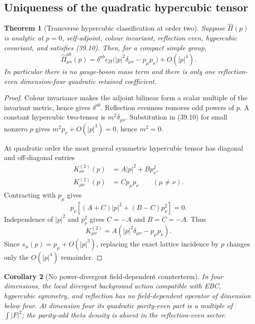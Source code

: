 \documentclass[11pt,oneside]{book}
\newtheorem{theorem}{Theorem}[chapter]
\newtheorem{corollary}[theorem]{Corollary}
\theoremstyle{definition}
\theoremstyle{remark}
\begin{document}
\subsection{Uniqueness of the quadratic hypercubic tensor}

\begin{theorem}[Transverse hypercubic classification at order two]
\label{thm:e8v39-hypercubic}
Suppose \(\widehat\Pi(p)\) is analytic at \(p=0\), self-adjoint,
colour invariant, reflection even, hypercubic covariant, and
satisfies (39.10).  Then, for a compact simple group,
\[
\boxed{\qquad
 \widehat\Pi_{\mu\nu}^{ab}(p)
 =
 \delta^{ab}c_\Pi
 \bigl(|p|^2\delta_{\mu\nu}-p_\mu p_\nu\bigr)
 +O(|p|^4).
\qquad}                                                         \tag{39.11}
\]
In particular there is no gauge-boson mass term and there is only one
reflection-even dimension-four quadratic retained coefficient.
\end{theorem}

\begin{proof}
Colour invariance makes the adjoint bilinear form a scalar multiple
of the invariant metric, hence gives \(\delta^{ab}\).  Reflection
evenness removes odd powers of \(p\).  A constant hypercubic
two-tensor is \(m^2\delta_{\mu\nu}\).  Substitution in (39.10) for
small nonzero \(p\) gives \(m^2p_\nu+O(|p|^3)=0\), hence \(m^2=0\).

At quadratic order the most general symmetric hypercubic tensor has
diagonal and off-diagonal entries
\[
\begin{split}
 K_{\nu\nu}^{(2)}(p)&=A|p|^2+Bp_\nu^2,\\
 K_{\mu\nu}^{(2)}(p)&=Cp_\mu p_\nu\qquad(\mu\ne\nu).             \tag{39.12}
\end{split}
\]
Contracting with \(p_\mu\) gives
\[
 p_\nu\left[(A+C)|p|^2+(B-C)p_\nu^2\right]=0.
\]
Independence of \(|p|^2\) and \(p_\nu^2\) gives
\(C=-A\) and \(B=C=-A\).  Thus
\[
 K_{\mu\nu}^{(2)}
 =A(|p|^2\delta_{\mu\nu}-p_\mu p_\nu).
\]
Since \(s_\mu(p)=p_\mu+O(|p|^3)\), replacing the exact lattice
incidence by \(p\) changes only the \(O(|p|^4)\) remainder.
\end{proof}

\begin{corollary}[No power-divergent field-dependent counterterm]
\label{cor:e8v39-no-power}
In four dimensions, the local divergent background action compatible
with EBC, hypercubic symmetry, and reflection has no
field-dependent operator of dimension below four.  At dimension four
its quadratic parity-even part is a multiple of
\(\int|F|^2\); the parity-odd theta density is absent in the
reflection-even sector.
\end{corollary}
\end{document}
